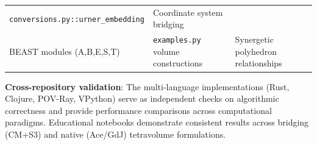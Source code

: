 \documentclass[
  10pt,
]{article}
\begin{document}
\begin{longtable}[]{@{}lll@{}}
\begin{minipage}[t]{0.35\columnwidth}
\texttt{conversions.py::urner\_embedding}\strut
\end{minipage} & \begin{minipage}[t]{0.26\columnwidth}\raggedright
Coordinate system bridging\strut
\end{minipage}\tabularnewline
\begin{minipage}[t]{0.30\columnwidth}\raggedright
BEAST modules (A,B,E,S,T)\strut
\end{minipage} & \begin{minipage}[t]{0.35\columnwidth}\raggedright
\texttt{examples.py} volume constructions\strut
\end{minipage} & \begin{minipage}[t]{0.26\columnwidth}\raggedright
Synergetic polyhedron relationships\strut
\end{minipage}\tabularnewline
\bottomrule
\end{longtable}

\textbf{Cross-repository validation}: The multi-language implementations
(Rust, Clojure, POV-Ray, VPython) serve as independent checks on
algorithmic correctness and provide performance comparisons across
computational paradigms. Educational notebooks demonstrate consistent
results across bridging (CM+S3) and native (Ace/GdJ) tetravolume
formulations.
\end{document}
